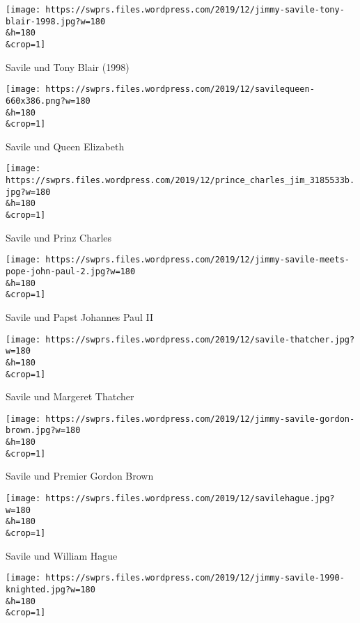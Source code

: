 \href{https://swprs.org/geopolitik-und-paedokriminalitaet/jimmy-savile-tony-blair-1998/}{}

\texttt{[image: https://swprs.files.wordpress.com/2019/12/jimmy-savile-tony-blair-1998.jpg?w=180\\\&h=180\\\&crop=1]}

Savile und Tony Blair (1998)

\href{https://swprs.org/geopolitik-und-paedokriminalitaet/savilequeen-660x386/}{}

\texttt{[image: https://swprs.files.wordpress.com/2019/12/savilequeen-660x386.png?w=180\\\&h=180\\\&crop=1]}

Savile und Queen Elizabeth

\href{https://swprs.org/geopolitik-und-paedokriminalitaet/prince_charles_jim_3185533b/}{}

\texttt{[image: https://swprs.files.wordpress.com/2019/12/prince\_charles\_jim\_3185533b.jpg?w=180\\\&h=180\\\&crop=1]}

Savile und Prinz Charles

\href{https://swprs.org/geopolitik-und-paedokriminalitaet/jimmy-savile-meets-pope-john-paul-2/}{}

\texttt{[image: https://swprs.files.wordpress.com/2019/12/jimmy-savile-meets-pope-john-paul-2.jpg?w=180\\\&h=180\\\&crop=1]}

Savile und Papst Johannes Paul II

\href{https://swprs.org/geopolitik-und-paedokriminalitaet/savile-thatcher/}{}

\texttt{[image: https://swprs.files.wordpress.com/2019/12/savile-thatcher.jpg?w=180\\\&h=180\\\&crop=1]}

Savile und Margeret Thatcher

\href{https://swprs.org/geopolitik-und-paedokriminalitaet/jimmy-savile-gordon-brown/}{}

\texttt{[image: https://swprs.files.wordpress.com/2019/12/jimmy-savile-gordon-brown.jpg?w=180\\\&h=180\\\&crop=1]}

Savile und Premier Gordon Brown

\href{https://swprs.org/geopolitik-und-paedokriminalitaet/tie-awards-savile-hague/}{}

\texttt{[image: https://swprs.files.wordpress.com/2019/12/savilehague.jpg?w=180\\\&h=180\\\&crop=1]}

Savile und William Hague

\href{https://swprs.org/geopolitik-und-paedokriminalitaet/jimmy-savile-1990-knighted/}{}

\texttt{[image: https://swprs.files.wordpress.com/2019/12/jimmy-savile-1990-knighted.jpg?w=180\\\&h=180\\\&crop=1]}

